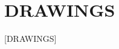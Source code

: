 \documentclass[12pt,letterpaper]{article}
\begin{document}
%
%
%
%
%
%
%

\newpage
\section*{DRAWINGS}

[DRAWINGS]
\end{document}
